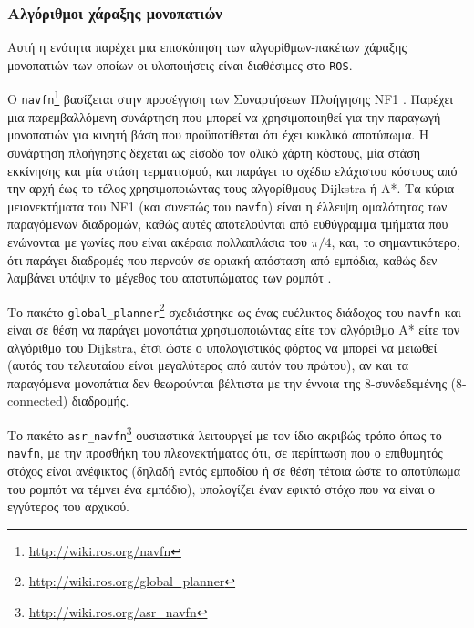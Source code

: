 \subsubsection{Αλγόριθμοι χάραξης μονοπατιών}
\label{subsubsection:02_01_02:03_01}

Αυτή η ενότητα παρέχει μια επισκόπηση των αλγορίθμων-πακέτων χάραξης μονοπατιών
των οποίων οι υλοποιήσεις είναι διαθέσιμες στο \texttt{ROS}.

O \texttt{navfn}\footnote{\url{http://wiki.ros.org/navfn}} βασίζεται στην
προσέγγιση των Συναρτήσεων Πλοήγησης NF1 \cite{Latombe1991}. Παρέχει μια
παρεμβαλλόμενη συνάρτηση που μπορεί να χρησιμοποιηθεί για την παραγωγή
μονοπατιών για κινητή βάση που προϋποτίθεται ότι έχει κυκλικό αποτύπωμα. Η
συνάρτηση πλοήγησης δέχεται ως είσοδο τον ολικό χάρτη κόστους, μία στάση
εκκίνησης και μία στάση τερματισμού, και παράγει το σχέδιο ελάχιστου κόστους
από την αρχή έως το τέλος χρησιμοποιώντας τους αλγορίθμους Dijkstra ή A*. Τα
κύρια μειονεκτήματα του NF1 (και συνεπώς του \texttt{navfn}) είναι η έλλειψη
ομαλότητας των παραγόμενων διαδρομών, καθώς αυτές αποτελούνται από ευθύγραμμα
τμήματα που ενώνονται με γωνίες που είναι ακέραια πολλαπλάσια του $\pi/4$, και,
το σημαντικότερο, ότι παράγει διαδρομές που περνούν σε οριακή απόσταση από
εμπόδια, καθώς δεν λαμβάνει υπόψιν το μέγεθος του αποτυπώματος των ρομπότ
\cite{Philippsen2004}.

Το πακέτο
\texttt{global\_planner}\footnote{\url{http://wiki.ros.org/global\_planner}}
σχεδιάστηκε ως ένας ευέλικτος διάδοχος του \texttt{navfn} και είναι σε θέση να
παράγει μονοπάτια χρησιμοποιώντας είτε τον αλγόριθμο A* είτε τον αλγόριθμο του
Dijkstra, έτσι ώστε ο υπολογιστικός φόρτος να μπορεί να μειωθεί (αυτός του
τελευταίου είναι μεγαλύτερος από αυτόν του πρώτου), αν και τα παραγόμενα
μονοπάτια δεν θεωρούνται βέλτιστα με την έννοια της 8-συνδεδεμένης (8-connected)
διαδρομής.

Το πακέτο \texttt{asr\_navfn}\footnote{\url{http://wiki.ros.org/asr\_navfn}}
ουσιαστικά λειτουργεί με τον ίδιο ακριβώς τρόπο όπως το \texttt{navfn}, με την
προσθήκη του πλεονεκτήματος ότι, σε περίπτωση που ο επιθυμητός στόχος είναι
ανέφικτος (δηλαδή εντός εμποδίου ή σε θέση τέτοια ώστε το αποτύπωμα του ρομπότ
να τέμνει ένα εμπόδιο), υπολογίζει έναν εφικτό στόχο που να είναι ο εγγύτερος
του αρχικού.

